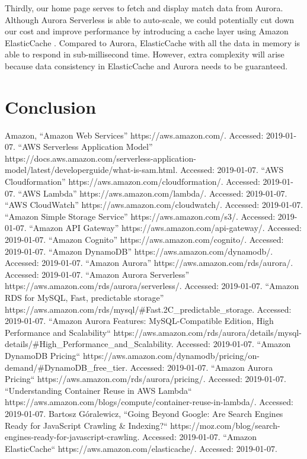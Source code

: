 \documentclass[conference]{IEEEtran}
\begin{document}
Thirdly, our home page serves to fetch and display match data from Aurora. Although Aurora Serverless is able to auto-scale, we could potentially cut down our cost and improve performance by introducing a cache layer using Amazon ElasticCache \cite{b18}. Compared to Aurora, ElasticCache with all the data in memory is able to respond in sub-millisecond time. However, extra complexity will arise because data consistency in ElasticCache and Aurora needs to be guaranteed.

\section{Conclusion}

\begin{thebibliography}{00}
 Amazon, “Amazon Web Services” https://aws.amazon.com/. Accessed: 2019-01-07.
 “AWS Serverless Application Model” https://docs.aws.amazon.com/serverless-application-model/latest/developerguide/what-is-sam.html. Accessed: 2019-01-07.
 “AWS Cloudformation” https://aws.amazon.com/cloudformation/. Accessed: 2019-01-07.
 “AWS Lambda” https://aws.amazon.com/lambda/. Accessed: 2019-01-07.
 “AWS CloudWatch” https://aws.amazon.com/cloudwatch/. Accessed: 2019-01-07.
 “Amazon Simple Storage Service” https://aws.amazon.com/s3/. Accessed: 2019-01-07.
 “Amazon API Gateway” https://aws.amazon.com/api-gateway/. Accessed: 2019-01-07.
 “Amazon Cognito” https://aws.amazon.com/cognito/. Accessed: 2019-01-07.
 “Amazon DynamoDB” https://aws.amazon.com/dynamodb/. Accessed: 2019-01-07.
 “Amazon Aurora” https://aws.amazon.com/rds/aurora/. Accessed: 2019-01-07.
 “Amazon Aurora Serverless” https://aws.amazon.com/rds/aurora/serverless/. Accessed: 2019-01-07.
 “Amazon RDS for MySQL, Fast, predictable storage” https://aws.amazon.com/rds/mysql/\#Fast.2C\_predictable\_storage. Accessed: 2019-01-07.
 “Amazon Aurora Features: MySQL-Compatible Edition, High Performance and Scalability“ https://aws.amazon.com/rds/aurora/details/mysql-details/\#High\_Performance\_and\_Scalability. Accessed: 2019-01-07.
 “Amazon DynamoDB Pricing“ https://aws.amazon.com/dynamodb/pricing/on-demand/\#DynamoDB\_free\_tier. Accessed: 2019-01-07.
 “Amazon Aurora Pricing“ https://aws.amazon.com/rds/aurora/pricing/. Accessed: 2019-01-07.
 “Understanding Container Reuse in AWS Lambda“ https://aws.amazon.com/blogs/compute/container-reuse-in-lambda/. Accessed: 2019-01-07.
 Bartosz Góralewicz, “Going Beyond Google: Are Search Engines Ready for JavaScript Crawling \& Indexing?“ https://moz.com/blog/search-engines-ready-for-javascript-crawling. Accessed: 2019-01-07.
 “Amazon ElasticCache“ https://aws.amazon.com/elasticache/. Accessed: 2019-01-07.
\end{thebibliography}
\vspace{12pt}
\end{document}
